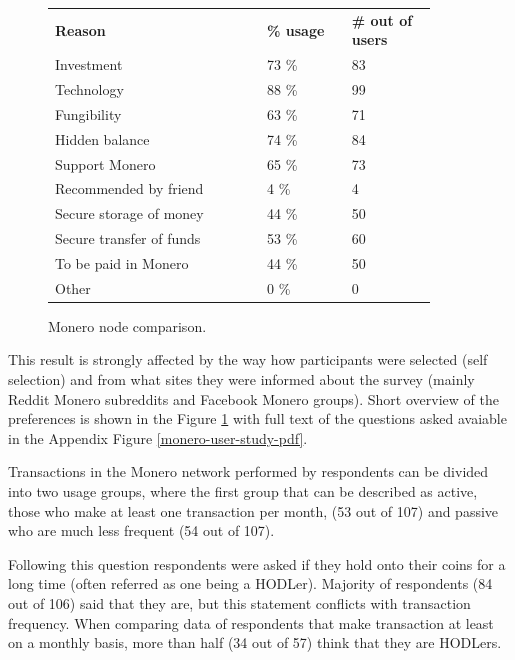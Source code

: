 \documentclass[
  printed, %
  table,   %
  nolof,     %
  nolot,     %
           oneside, color
]{fithesis3}
\begin{document}
\begin{figure}[H]
\center
\begin{tabular}{p{0.5\linewidth}p{0.2\linewidth}p{0.2\linewidth}}
\textbf{Reason}          & \textbf{\% usage} & \textbf{\# out of users} \\
Investment               & 73 \%             & 83                \\
Technology               & 88 \%             & 99                \\
Fungibility              & 63 \%             & 71                \\
Hidden balance           & 74 \%             & 84                \\
Support Monero           & 65 \%             & 73                \\
Recommended by friend    & 4 \%              & 4                 \\
Secure storage of money  & 44 \%             & 50                \\
Secure transfer of funds & 53 \%             & 60                \\
To be paid in Monero     & 44 \%             & 50                \\
Other                    & 0 \%              & 0                
\end{tabular}
\caption{Monero node comparison.}
\label{table:monerousageresearch}
\end{figure}

This result is strongly affected by the way how participants were selected (self selection) and from what sites they were informed about the survey (mainly Reddit Monero subreddits and Facebook Monero groups). Short overview of the preferences is shown in the Figure \ref{table:monerousageresearch} with full text of the questions asked avaiable in the Appendix Figure \ref{monero-user-study-pdf}.

Transactions in the Monero network performed by respondents can be divided into two usage groups, where the first group that can be described as active, those who make at least one transaction per month, (53 out of 107) and passive who are much less frequent (54 out of 107). 

Following this question respondents were asked if they hold onto their coins for a long time (often referred as one being a HODLer). Majority of respondents (84 out of 106) said that they are, but this statement conflicts with transaction frequency. When comparing data of respondents that make transaction at least on a monthly basis, more than half (34 out of 57) think that they are HODLers. 
\end{document}
